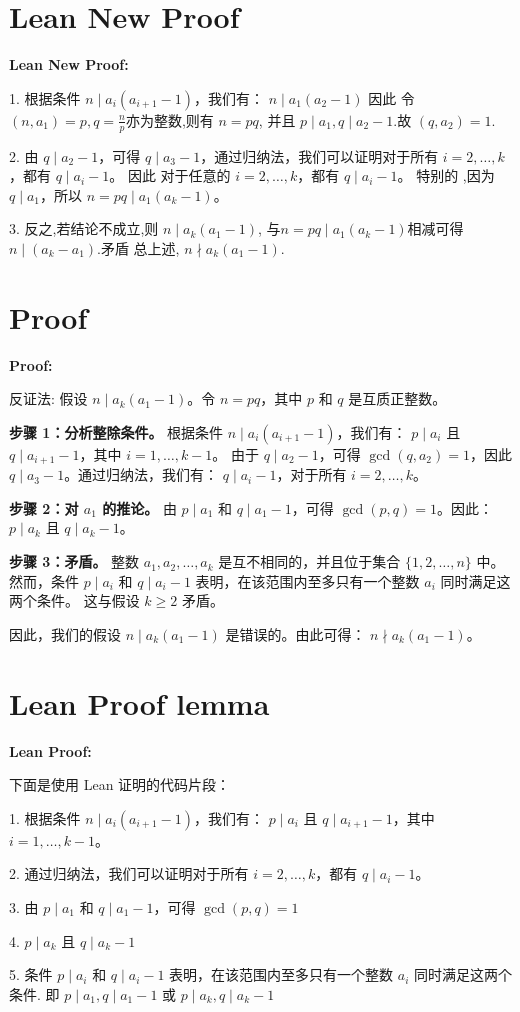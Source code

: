 \documentclass[a4paper]{article}
\begin{document}
\section*{Lean New Proof}
    \textbf{Lean New Proof:}
    
    1. 根据条件 $n \mid a_i(a_{i+1}-1)$，我们有：
    $n \mid a_1(a_2 - 1)$ 因此 令 $(n,a_1) = p,q =\frac{n}{p}$亦为整数,则有 $n = pq$,
    并且 $p \mid a_1,q \mid a_2 - 1$.故 $(q,a_2) = 1$.
    
    2. 由 $q \mid a_2 - 1$，可得 $q \mid a_3 - 1$，通过归纳法，我们可以证明对于所有 $i = 2, \ldots, k$，都有 $q \mid a_i - 1$。
    因此 对于任意的 $i = 2, \ldots, k$，都有 $q \mid a_i - 1$。
    特别的 ,因为 $q \mid a_1$，所以 $n = pq \mid a_1(a_k - 1)$。
    
    3. 反之,若结论不成立,则 $n \mid a_k(a_1 - 1)$, 与$n = pq \mid a_1(a_k - 1)$相减可得 $n \mid (a_k - a_1)$.矛盾
    总上述, $n \nmid a_k(a_1 - 1)$.

\section*{Proof}
    \textbf{Proof:}

    反证法: 假设 $n \mid a_k(a_1-1)$。令 $n = pq$，其中 $p$ 和 $q$ 是互质正整数。

    \textbf{步骤 1：分析整除条件。}  
    根据条件 $n \mid a_i(a_{i+1}-1)$，我们有：
    $p \mid a_i$ 且 $q \mid a_{i+1}-1$，其中 $i = 1, \ldots, k-1$。
    由于 $q \mid a_2-1$，可得 $\gcd(q, a_2) = 1$，因此 $q \mid a_3-1$。通过归纳法，我们有：
    $q \mid a_i-1$，对于所有 $i = 2, \ldots, k$。

    \textbf{步骤 2：对 $a_1$ 的推论。}  
    由 $p \mid a_1$ 和 $q \mid a_1-1$，可得 $\gcd(p, q) = 1$。因此：
    $p \mid a_k$ 且 $q \mid a_k-1$。

    \textbf{步骤 3：矛盾。}  
    整数 $a_1, a_2, \ldots, a_k$ 是互不相同的，并且位于集合 $\{1, 2, \ldots, n\}$ 中。
    然而，条件 $p \mid a_i$ 和 $q \mid a_i-1$ 表明，在该范围内至多只有一个整数 $a_i$ 同时满足这两个条件。
    这与假设 $k \geq 2$ 矛盾。

    因此，我们的假设 $n \mid a_k(a_1-1)$ 是错误的。由此可得：
    $n \nmid a_k(a_1-1)$。

\section*{Lean Proof lemma}
    \textbf{Lean Proof:}

    下面是使用 Lean 证明的代码片段：

    1. 根据条件 $n \mid a_i(a_{i+1}-1)$，我们有：
    $p \mid a_i$ 且 $q \mid a_{i+1}-1$，其中 $i = 1, \ldots, k-1$。

    2. 通过归纳法，我们可以证明对于所有 $i = 2, \ldots, k$，都有 $q \mid a_i-1$。

    3. 由 $p \mid a_1$ 和 $q \mid a_1-1$，可得 $\gcd(p, q) = 1$

    4. $p \mid a_k$ 且 $q \mid a_k-1$

    5. 条件 $p \mid a_i$ 和 $q \mid a_i-1$ 表明，在该范围内至多只有一个整数 $a_i$ 同时满足这两个条件.
    即 $p \mid a_1, q \mid a_1-1$ 或 $p \mid a_k, q \mid a_k-1$



    
\end{document}
